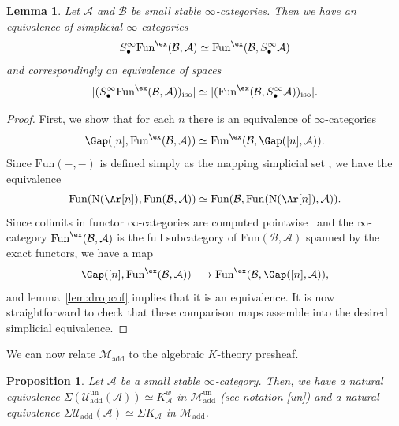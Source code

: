 \documentclass{amsart}
\newcommand{\ssdot}{\bullet}%
\newcommand{\iSdot}[1][\ssdot]{S^{\infty}_{#1}}
\newcommand{\htp}{\simeq}
\renewcommand{\to}{\mathchoice{\longrightarrow}{\rightarrow}{\rightarrow}{\rightarrow}}
\newcommand{\cA}{{\mathcal A}}
\newcommand{\cM}{{\mathcal M}}
\newcommand{\cU}{{\mathcal U}}
\let\catsymbfont\mathcal
\newcommand{\aA}{{\catsymbfont{A}}}
\newcommand{\aB}{{\catsymbfont{B}}}
\newcommand{\lkan}[1]{(#1)_{\mathrm{iso}}}
\newcommand{\N}{\mathrm{N}}
\newcommand{\Fun}{\mathrm{Fun}} %
\renewcommand{\i}{\infty}
\newcommand{\Motadd}{\cM_{\mathrm{add}}}
\newcommand{\Motaddun}{\cM_{\mathrm{add}}^{\mathrm{un}}}
\newcommand{\Umot}{\cU_{\mathrm{add}}}
\newcommand{\Umotun}{\cU_{\mathrm{add}}^{\mathrm{un}}}
\numberwithin{equation}{section}
\newtheorem{lemma}[equation]{Lemma}
\newtheorem{proposition}[equation]{Proposition}
\theoremstyle{definition}
\begin{document}
\begin{lemma}\label{lem:scomm}
Let $\aA$ and $\aB$ be small stable $\i$-categories.  Then we 
have an equivalence of simplicial $\i$-categories
\[
\iSdot \Fun^{\ex}(\aB, \aA) \htp \Fun^{\ex}(\aB, \iSdot \aA)
\]
and correspondingly an equivalence of spaces
\[
|\lkan{\iSdot \Fun^{\ex}(\aB, \aA)}| \htp |\lkan{\Fun^{\ex}(\aB, \iSdot \aA)}|.
\]
\end{lemma}

\begin{proof}
First, we show that for each $n$ there is an equivalence of
$\i$-categories 
\[
\Gap([n], \Fun^{\ex}(\aB,\aA)) \htp \Fun^{\ex}(\aB, \Gap([n], \aA)). 
\]
Since $\Fun(-,-)$ is defined simply as the mapping simplicial
set \cite[1.2.7.2]{HTT}, we have the equivalence
\[
\Fun(\N(\Ar[n]), \Fun(\aB, \aA)) \htp \Fun(\aB, \Fun(\N(\Ar[n]), \aA)).
\]
Since colimits in functor $\i$-categories are computed
pointwise~\cite[\S 5.1.2.3]{HTT} and the $\i$-category
$\Fun^{\ex}(\aB, \aA)$ is the full subcategory of $\Fun(\aB,\aA)$ 
spanned by the exact functors, we have a map
\[
\Gap([n], \Fun^{\ex}(\aB, \aA)) \to \Fun^{\ex}(\aB, \Gap([n], \aA)),
\]
and lemma~\ref{lem:dropcof} implies that it is an equivalence.  It
is now straightforward to check that these comparison maps assemble
into the desired simplicial equivalence. 
\end{proof}

We can now relate $\Motadd$ to the algebraic $K$-theory presheaf.

\begin{proposition}\label{prop:suspensions}
Let $\cA$ be a small stable $\i$-category. Then, we have a natural
equivalence $ \Sigma( \Umotun(\aA)) \simeq K^{w}_\aA$ in
$\Motaddun$ (see notation \ref{un}) and a natural equivalence $\Sigma \Umot(\aA) \simeq\Sigma K_{\aA}$ in $\Motadd$.
\end{proposition}
\end{document}
